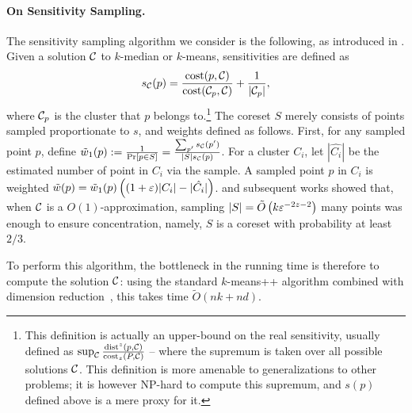\paragraph*{On Sensitivity Sampling.}
The sensitivity sampling algorithm we consider is the following, as introduced in \cite{FeldmanL11}.
Given a solution $\mathcal C$ to $k$-median or $k$-means, sensitivities are defined as
\begin{equation}
\label{eq:sensitivity}
 s_\mathcal C(p) = \dfrac{\operatorname{cost}(p, \mathcal C)}{\operatorname{cost}(\mathcal C_{p}, \mathcal C)} + \dfrac{1}{|\mathcal C_p|},
\end{equation}
where $\mathcal C_p$ is the cluster that $p$ belongs to.\footnote{This definition is actually an upper-bound on the real sensitivity, 
usually defined as $\sup_{\mathcal C} \frac{\operatorname{dist}^z(p, \mathcal C)}{\operatorname{cost}_z(P, \mathcal C)}$ -- where the supremum is taken over all possible solutions $\mathcal C$.
 This definition is more amenable to generalizations to other problems; it is however NP-hard to compute this supremum, and $s(p)$ defined above is a mere proxy for it.}
The coreset $S$ merely consists of points sampled proportionate to $s$, and weights defined as follows. First, for any sampled point $p$, define $\tilde w_1(p) := \frac{1}{\Pr[p \in S]} = \frac{\sum_{p'} s_\mathcal C(p')}{|S| s_\mathcal C(p)}$. For a cluster $C_i$, let $|\hat{C_i}|$ be the estimated number of point in $C_i$ via the sample. A sampled point $p$ in $C_i$ is weighted $\tilde w(p) = \tilde w_1(p) \left( (1+\varepsilon)|C_i| - |\hat{C_i}|\right)$.
%
\cite{FeldmanL11} and subsequent works showed that, when $\mathcal C$ is a $O(1)$-approximation, sampling $|S| = \tilde O\left( k \varepsilon^{-2z-2}\right)$ many points was enough to ensure concentration, namely, $S$ is a coreset with probability at least $2/3$.

 To perform this algorithm, the bottleneck in the running time is therefore to compute the solution $\mathcal C$: using the standard $k$-means++ algorithm \cite{ArV07} combined with dimension reduction~\cite{NaN18}, this takes time $\tilde O(nk +nd)$. 



